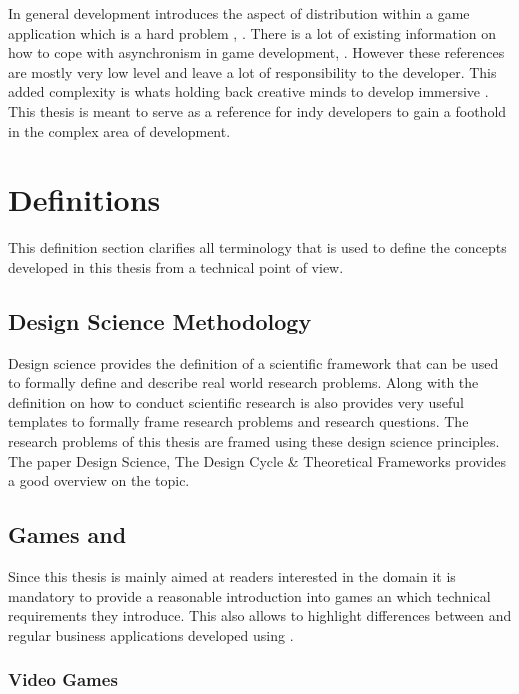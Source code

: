In general \og{} development introduces the aspect of distribution within a game
application which is a hard problem \cite{pneuli1990distributed},
\cite{kupermann2001synthesizing}. There is a lot of existing information on how
to cope with asynchronism in game development\cite{gambetta_fast_paced},
\cite{gafferon2017games}. However these references are mostly very low level and
leave a lot of responsibility to the developer. This added complexity is whats
holding back creative minds to develop immersive \ogs{}. This thesis is meant to
serve as a reference for indy developers to gain a foothold in the complex area
of \og{} development.

\section{Definitions}

This definition section clarifies all terminology that is used to define the
concepts developed in this thesis from a technical point of view.

\subsection{Design Science Methodology}

Design science provides the definition of a scientific framework that can be
used to formally define and describe real world research problems. Along with the
definition on how to conduct scientific research is also provides very useful
templates to formally frame research problems and research questions. The
research problems of this thesis are framed using these design science
principles. The paper Design Science, The Design Cycle \& Theoretical Frameworks
\cite{biedermann2016design_science} provides a good overview on the topic.

\subsection{Games and \ogs{}}
\label{sub:games}

Since this thesis is mainly aimed at readers interested in the \ms{} domain it
is mandatory to provide a reasonable introduction into games an which technical
requirements they introduce. This also allows to highlight differences between
\ogs{} and regular business applications developed using \mss{}.

\subsubsection{Video Games}

